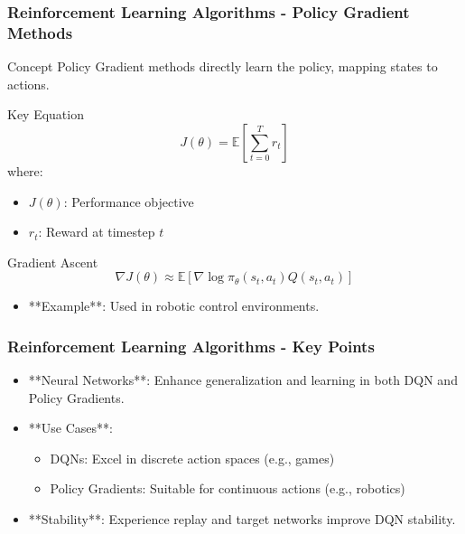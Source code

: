 \documentclass[aspectratio=169]{beamer}
\begin{document}
\begin{frame}[fragile]
    \frametitle{Reinforcement Learning Algorithms - Policy Gradient Methods}
    
    \begin{block}{Concept}
        Policy Gradient methods directly learn the policy, mapping states to actions.
    \end{block}
    
    \begin{block}{Key Equation}
        \begin{equation}
        J(\theta) = \mathbb{E}[\sum_{t=0}^{T} r_t]
        \end{equation}
        where:
        \begin{itemize}
            \item \( J(\theta) \): Performance objective
            \item \( r_t \): Reward at timestep \( t \)
        \end{itemize}
    \end{block}

    \begin{block}{Gradient Ascent}
        \begin{equation}
        \nabla J(\theta) \approx \mathbb{E}\left[ \nabla \log \pi_{\theta}(s_t, a_t) Q(s_t, a_t) \right]
        \end{equation}
    \end{block}
    
    \begin{itemize}
        \item **Example**: Used in robotic control environments.
    \end{itemize}

\end{frame}

\begin{frame}[fragile]
    \frametitle{Reinforcement Learning Algorithms - Key Points}
    
    \begin{itemize}
        \item **Neural Networks**: Enhance generalization and learning in both DQN and Policy Gradients.
        \item **Use Cases**: 
        \begin{itemize}
            \item DQNs: Excel in discrete action spaces (e.g., games)
            \item Policy Gradients: Suitable for continuous actions (e.g., robotics)
        \end{itemize}
        \item **Stability**: Experience replay and target networks improve DQN stability.
    \end{itemize}

\end{frame}
\end{document}
